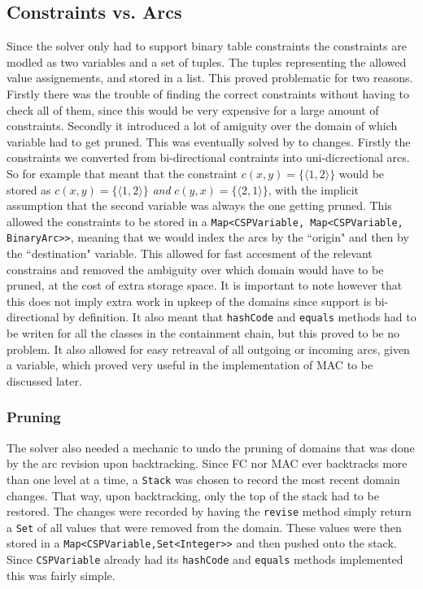\documentclass[british]{article}
\newcommand{\code}[1]{\texttt{#1}}
\begin{document}
\subsection{Constraints vs. Arcs} Since the solver only had to support binary table constraints the constraints are modled as two variables and a set of tuples. The tuples representing the allowed value assignements, and stored in a list. This proved problematic for two reasons. Firstly there was the trouble of finding the correct constraints without having to check all of them, since this would be very expensive for a large amount of constraints. Secondly it introduced a lot of amiguity over the domain of which variable had to get pruned. This was eventually solved by to changes. Firstly the constraints we converted from bi-directional contraints into uni-dicrectional arcs. So for example that meant that the constraint $c(x,y) = \{\langle1,2\rangle\}$ would be stored as $c(x,y) = \{\langle1,2\rangle\}$ \textit{and} $c(y,x) = \{\langle2,1\rangle\}$, with the implicit assumption that the second variable was always the one getting pruned. This allowed the constraints to be stored in a \code{Map<CSPVariable, Map<CSPVariable, BinaryArc>>}, meaning that we would index the arcs by the ``origin" and then by the ``destination" variable. This allowed for fast accesment of the relevant constrains and removed the ambiguity over which domain would have to be pruned, at the cost of extra storage space. It is important to note however that this does not imply extra work in upkeep of the domains since support is bi-directional by definition. It also meant that \code{hashCode} and \code{equals} methods had to be writen for all the classes in the containment chain, but this proved to be no problem. It also allowed for easy retreaval of all outgoing or incoming arcs, given a variable, which proved very useful in the implementation of MAC to be discussed later. 

\subsubsection{Pruning} The solver also needed a mechanic to undo the pruning of domains that was done by the arc revision upon backtracking. Since FC nor MAC ever backtracks more than one level at a time, a \code{Stack} was chosen to record the most recent domain changes. That way, upon backtracking, only the top of the stack had to be restored. The changes were recorded by having the \code{revise} method simply return a \code{Set} of all values that were removed from the domain. These values were then stored in a \code{Map<CSPVariable,Set<Integer>>}  and then pushed onto the stack. Since \code{CSPVariable} already had its \code{hashCode} and \code{equals} methods implemented this was fairly simple. 
 
\end{document}
